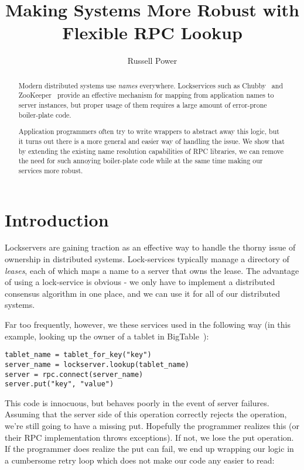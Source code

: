 \documentclass[psfig,10pt]{article}
\title{Making Systems More Robust with Flexible RPC Lookup}
\author{Russell Power}
\date{}
\begin{document}
\maketitle

\begin{abstract} 
  
Modern distributed systems use \emph{names} everywhere.  Lockservices such as
Chubby~\cite{chubby} and ZooKeeper~\cite{zookeeper} provide an effective
mechanism for mapping from application names to server instances, but proper
usage of them requires a large amount of error-prone boiler-plate code.

Application programmers often try to write wrappers to abstract away this logic,
but it turns out there is a more general and easier way of handling the issue.  
We show that by extending the existing name resolution capabilities of 
RPC libraries, we can remove the need for such annoying boiler-plate code while
at the same time making our services more robust.  

\end{abstract}

\section{Introduction}

Lockservers are gaining traction as an effective way to handle the thorny issue
of ownership in distributed systems.  Lock-services typically manage a
directory of \emph{leases}, each of which maps a name to a server that owns the
lease.  The advantage of using a lock-service is obvious - we only have to
implement a distributed consensus algorithm in one place, and we can use it for
all of our distributed systems.

Far too frequently, however, we these services used in the following
way (in this example, looking up the owner of a tablet in BigTable~\cite{bigtable}):

\begin{lstlisting}[caption=Simple BigTable lookup.]
tablet_name = tablet_for_key("key")
server_name = lockserver.lookup(tablet_name)
server = rpc.connect(server_name)
server.put("key", "value")
\end{lstlisting}

This code is innocuous, but behaves poorly in the event of server failures.
Assuming that the server side of this operation correctly rejects the 
operation, we're still going to have a missing put.  Hopefully the programmer
realizes this (or their RPC implementation throws exceptions).  If not, 
we lose the put operation.  If the programmer does realize the put can fail,
we end up wrapping our logic in a cumbersome retry loop which does not make our
code any easier to read:
\end{document}
